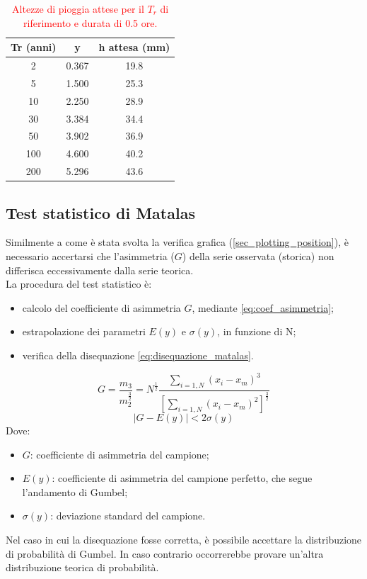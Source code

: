 \begin{table}[H] \centering
    \caption{\textcolor{red}{Altezze di pioggia attese per il $T_r$ di riferimento e durata di 0.5 ore.}}
        \begin{tabular}{ccc}
        \toprule
        Tr (anni) & y     & h attesa (mm) \\
        \midrule
        2 & 0.367 & 19.8  \\
        5 & 1.500 & 25.3  \\
        10  & 2.250 & 28.9          \\
        30  & 3.384 & 34.4          \\
        50  & 3.902 & 36.9          \\
        100 & 4.600 & 40.2          \\
        200 & 5.296 & 43.6          \\         
        \bottomrule
        \end{tabular}
\end{table}
    
\subsection{Test statistico di Matalas}
Similmente a come è stata svolta la verifica grafica (\ref{sec_plotting_position}), è necessario accertarsi che l'asimmetria ($G$) della serie osservata (storica) non differisca eccessivamente dalla serie teorica.\\
La procedura del test statistico è:
\begin{itemize}
\item calcolo del coefficiente di asimmetria $G$, mediante \eqref{eq:coef_asimmetria};
\item estrapolazione dei parametri $E(y)$ e $\sigma(y)$, in funzione di N;
\item verifica della disequazione \eqref{eq:disequazione_matalas}.
\end{itemize}
\begin{equation}
    G = \frac{m_3}{m_2^{\frac{3}{2}}} = N^{\frac{1}{2}} \frac{\sum_{i=1,N}(x_i - x_m)^3}{\left[\sum_{i=1,N}(x_i-x_m)^2\right]^{\frac{3}{2}}}
    \label{eq:coef_asimmetria}
\end{equation}
\begin{equation}
    |G - E (y)| < 2 \sigma(y)
    \label{eq:disequazione_matalas}
\end{equation}
Dove:
\begin{itemize}
    \item $G$: coefficiente di asimmetria del campione;
    \item $E(y)$: coefficiente di asimmetria del campione perfetto, che segue l'andamento di Gumbel;
    \item $\sigma (y)$: deviazione standard del campione.
\end{itemize}
Nel caso in cui la disequazione fosse corretta, è possibile accettare la distribuzione di probabilità di Gumbel. In caso contrario occorrerebbe provare un'altra distribuzione teorica di probabilità.

